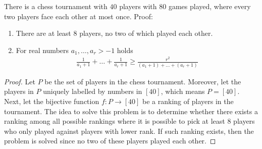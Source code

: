 \begin{problem}
  There is a chess tournament with $40$ players with $80$ games played, where every two players face each other at most once. Proof:
  \begin{enumerate}[label=(\roman*)]
    \item There are at least $8$ players, no two of which played each other.
    \item For real numbers $a_{1}, \ldots, a_{r} > -1$ holds
      \begin{align*}
        \frac{1}{a_{1} + 1} + \ldots + \frac{1}{a_{r} + 1} \geq \frac{r^{2}}{(a_{1} + 1) + \ldots + (a_{r} + 1)}
      \end{align*}
  \end{enumerate}
\end{problem}
\begin{proof}
  Let $P$ be the set of players in the chess tournament. Moreover, let the players in $P$ uniquely labelled by numbers in $[40]$, which means $P = [40]$. Next, let the bijective function $f : P \to [40]$ be a ranking of players in the tournament. The idea to solve this problem is to determine whether there exists a ranking among all possible rankings where it is possible to pick at least $8$ players who only played against players with lower rank. If such ranking exists, then the problem is solved since no two of these players played each other. 


\end{proof}
